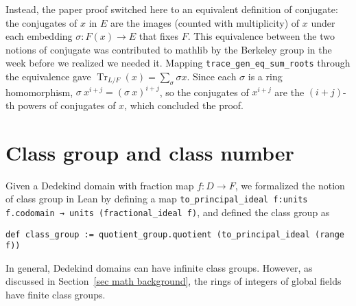 \documentclass[a4paper,USenglish,cleveref, autoref, thm-restate]{lipics-v2021}
\newcommand{\lean}[1]{\texttt{#1}\xspace} %
\DeclareMathOperator{\Tr}{Tr}
\newcommand{\mathlib}{\textsf{mathlib}\xspace}
\begin{document}
Instead, the paper proof switched here to an equivalent definition of conjugate:
the conjugates of $x$ in $E$ are the images (counted with multiplicity) of $x$ under each embedding $\sigma \colon F(x) \to E$ that fixes $F$. This equivalence between the two notions of conjugate was contributed to \mathlib by the Berkeley group in the week before we realized we needed it. Mapping \lean{trace\_gen\_eq\_sum\_roots} through the equivalence gave
$\Tr_{L / F}(x) = \sum_{\sigma} \sigma x$.
Since each $\sigma$ is a ring homomorphism, $\sigma\ x^{i + j} = (\sigma\ x)^{i + j}$,
so the conjugates of $x^{i + j}$ are the $(i + j)$-th powers of conjugates of $x$, which concluded the proof.

\section{Class group and class number} \label{sec:class-number}

Given a Dedekind domain with fraction map $f\colon D\to F$, we formalized the notion of class group in Lean by defining a map \lean{to\_principal\_ideal f:units f.codomain → units (fractional\_ideal f)}, %
and defined the class group as
\begin{lstlisting}
def class_group := quotient_group.quotient (to_principal_ideal (range f))
\end{lstlisting}
In general, Dedekind domains can have infinite class groups. However, as discussed in Section~\ref{sec math background}, the rings of integers of global fields have finite class groups.
\end{document}
